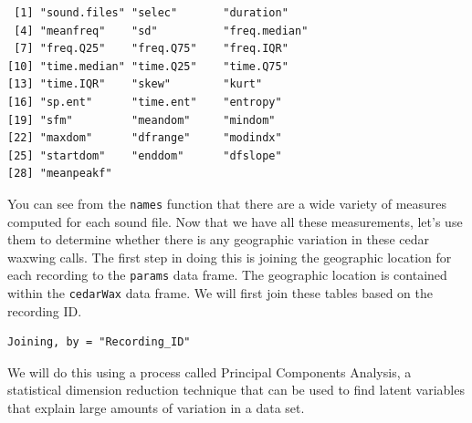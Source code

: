 \documentclass[
]{krantz}
\makeatletter
\newenvironment{Shaded}{\begin{snugshade}}{\end{snugshade}}
\newcommand{\CharTok}[1]{\textcolor[rgb]{0.5,0.5,0.5}{#1}}
\newcommand{\KeywordTok}[1]{\textcolor[rgb]{0.27,0.27,0.27}{\textbf{#1}}}
\newcommand{\NormalTok}[1]{#1}
\newcommand{\OperatorTok}[1]{\textcolor[rgb]{0.43,0.43,0.43}{\textbf{#1}}}
\newcommand{\StringTok}[1]{\textcolor[rgb]{0.5,0.5,0.5}{#1}}
\newenvironment{kframe}{%
\medskip{}
\setlength{\fboxsep}{.8em}
 \def\at@end@of@kframe{}%
 \ifinner\ifhmode%
  \def\at@end@of@kframe{\end{minipage}}%
  \begin{minipage}{\columnwidth}%
 \fi\fi%
 \def\FrameCommand##1{\hskip\@totalleftmargin \hskip-\fboxsep
 \colorbox{shadecolor}{##1}\hskip-\fboxsep
     \hskip-\linewidth \hskip-\@totalleftmargin \hskip\columnwidth}%
 \MakeFramed {\advance\hsize-\width
   \@totalleftmargin\z@ \linewidth\hsize
   \@setminipage}}%
 {\par\unskip\endMakeFramed%
 \at@end@of@kframe}
\renewenvironment{Shaded}{\begin{kframe}}{\end{kframe}}
\makeatother
\begin{document}
\begin{verbatim}
 [1] "sound.files" "selec"       "duration"   
 [4] "meanfreq"    "sd"          "freq.median"
 [7] "freq.Q25"    "freq.Q75"    "freq.IQR"   
[10] "time.median" "time.Q25"    "time.Q75"   
[13] "time.IQR"    "skew"        "kurt"       
[16] "sp.ent"      "time.ent"    "entropy"    
[19] "sfm"         "meandom"     "mindom"     
[22] "maxdom"      "dfrange"     "modindx"    
[25] "startdom"    "enddom"      "dfslope"    
[28] "meanpeakf"  
\end{verbatim}

You can see from the \texttt{names} function that there are a wide variety of measures computed for each sound file. Now that we have all these measurements, let's use them to determine whether there is any geographic variation in these cedar waxwing calls. The first step in doing this is joining the geographic location for each recording to the \texttt{params} data frame. The geographic location is contained within the \texttt{cedarWax} data frame. We will first join these tables based on the recording ID.

\begin{Shaded}
\end{Shaded}

\begin{verbatim}
Joining, by = "Recording_ID"
\end{verbatim}

We will do this using a process called Principal Components Analysis, a statistical dimension reduction technique that can be used to find latent variables that explain large amounts of variation in a data set.
\end{document}
